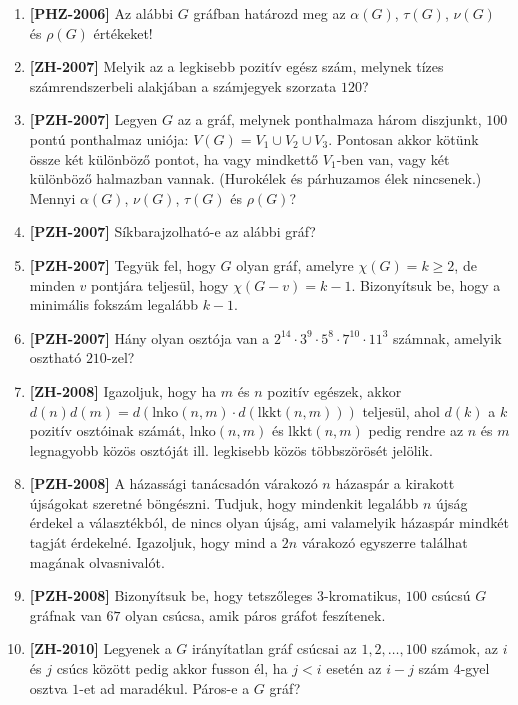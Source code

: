 \documentclass[a4paper]{article}
\begin{document}
\begin{enumerate}
		\begin{figure}[h]
			\centering
			
		\end{figure}
	\item \textbf{[PHZ-2006]} Az alábbi $G$ gráfban határozd meg az $\alpha(G)$, $\tau(G)$, $\nu(G)$ és $\rho(G)$ értékeket!
		\begin{figure}[h]
			\centering
			
		\end{figure}
	\item \textbf{[ZH-2007]} Melyik az a legkisebb pozitív egész szám, melynek tízes számrendszerbeli alakjában a számjegyek szorzata $120$?
	\item \textbf{[PZH-2007]} Legyen $G$ az a gráf, melynek ponthalmaza három diszjunkt, $100$ pontú ponthalmaz uniója: $V(G)=V_1 \cup V_2 \cup V_3$. Pontosan akkor kötünk össze két különböző pontot, ha vagy mindkettő $V_1$-ben van, vagy két különböző halmazban vannak. (Hurokélek és párhuzamos élek nincsenek.) Mennyi $\alpha(G)$, $\nu(G)$, $\tau(G)$ és $\rho(G)$?
	\item \textbf{[PZH-2007]} Síkbarajzolható-e az alábbi gráf?
		\begin{figure}[h]
			\centering
			
		\end{figure}
	\item \textbf{[PZH-2007]} Tegyük fel, hogy $G$ olyan gráf, amelyre $\chi(G)=k\geq 2$, de minden $v$ pontjára teljesül, hogy $\chi(G-v)=k-1$. Bizonyítsuk be, hogy a minimális fokszám legalább $k-1$.
	\item \textbf{[PZH-2007]} Hány olyan osztója van a $2^{14}\cdot 3^9\cdot 5^8\cdot 7^{10} \cdot 11^3$ számnak, amelyik osztható $210$-zel?
	\item \textbf{[ZH-2008]} Igazoljuk, hogy ha $m$ és $n$ pozitív egészek, akkor $d(n)d(m)=d(\text{lnko}(n,m) \cdot d(\text{lkkt}(n,m)))$ teljesül, ahol $d(k)$ a $k$ pozitív osztóinak számát, $\text{lnko}(n,m)$ és $\text{lkkt}(n,m)$ pedig rendre az $n$ és $m$ legnagyobb közös osztóját ill. legkisebb közös többszörösét jelölik.
	\item \textbf{[PZH-2008]} A házassági tanácsadón várakozó $n$ házaspár a kirakott újságokat szeretné böngészni. Tudjuk, hogy mindenkit legalább $n$ újság érdekel a választékból, de nincs olyan újság, ami valamelyik házaspár mindkét tagját érdekelné. Igazoljuk, hogy mind a $2n$ várakozó egyszerre találhat magának olvasnivalót.
	\item \textbf{[PZH-2008]} Bizonyítsuk be, hogy tetszőleges $3$-kromatikus, $100$ csúcsú $G$ gráfnak van $67$ olyan csúcsa, amik páros gráfot feszítenek.
	\item \textbf{[ZH-2010]} Legyenek a $G$ irányítatlan gráf csúcsai az $1,2,\ldots , 100$ számok, az $i$ és $j$ csúcs között pedig akkor fusson él, ha $j<i$ esetén az $i-j$ szám $4$-gyel osztva $1$-et ad maradékul. Páros-e a $G$ gráf?
\end{enumerate}
\end{document}
